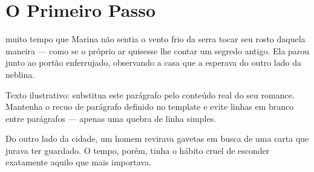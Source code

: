 \chapter{O Primeiro Passo}

 muito tempo que Marina não sentia o vento frio da
serra tocar seu rosto daquela maneira --- como se o próprio ar quisesse lhe
contar um segredo antigo. Ela parou junto ao portão enferrujado, observando
a casa que a esperava do outro lado da neblina.

Texto ilustrativo: substitua este parágrafo pelo conteúdo real do seu
romance. Mantenha o recuo de parágrafo definido no template e evite linhas
em branco entre parágrafos --- apenas uma quebra de linha simples.

\cenaseguinte

Do outro lado da cidade, um homem revirava gavetas em busca de uma carta
que jurava ter guardado. O tempo, porém, tinha o hábito cruel de esconder
exatamente aquilo que mais importava.
